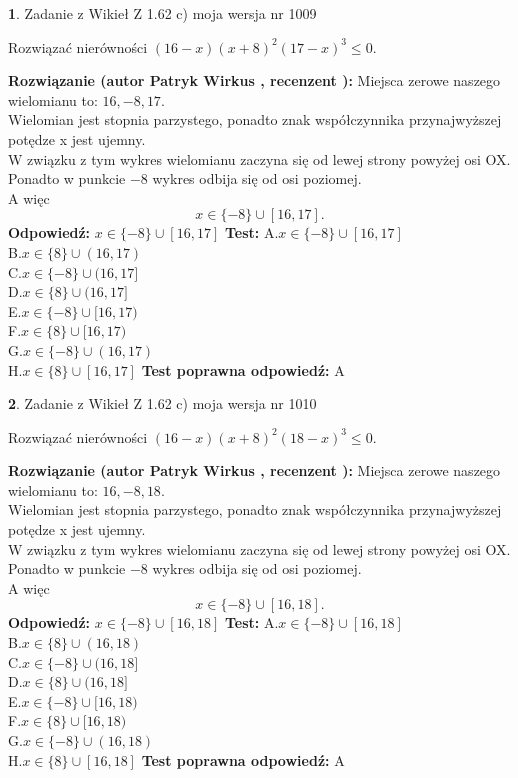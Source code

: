 \documentclass[12pt, a4paper]{article}
\theoremstyle{definition} %
\newtheorem{zad}{}
\newcommand{\zadStart}[1]{\begin{zad}#1\newline}
\newcommand{\zadStop}{\end{zad}}
\newcommand{\rozwStart}[2]{\noindent \textbf{Rozwiązanie (autor #1 , recenzent #2): }\newline}
\newcommand{\rozwStop}{\newline}
\newcommand{\odpStart}{\noindent \textbf{Odpowiedź:}\newline}
\newcommand{\odpStop}{\newline}
\newcommand{\testStart}{\noindent \textbf{Test:}\newline}
\newcommand{\testStop}{\newline}
\newcommand{\kluczStart}{\noindent \textbf{Test poprawna odpowiedź:}\newline}
\newcommand{\kluczStop}{\newline}
\begin{document}
\zadStart{Zadanie z Wikieł Z 1.62 c) moja wersja nr 1009}

Rozwiązać nierówności $(16-x)(x+8)^{2}(17-x)^{3}\le0$.
\zadStop
\rozwStart{Patryk Wirkus}{}
Miejsca zerowe naszego wielomianu to: $16, -8, 17$.\\
Wielomian jest stopnia parzystego, ponadto znak współczynnika przy\linebreak najwyższej potędze x jest ujemny.\\ W związku z tym wykres wielomianu zaczyna się od lewej strony powyżej osi OX.\\
Ponadto w punkcie $-8$ wykres odbija się od osi poziomej.\\
A więc $$x \in \{-8\} \cup [16,17].$$
\rozwStop
\odpStart
$x \in \{-8\} \cup [16,17]$
\odpStop
\testStart
A.$x \in \{-8\} \cup [16,17]$\\
B.$x \in \{8\} \cup (16,17)$\\
C.$x \in \{-8\} \cup (16,17]$\\
D.$x \in \{8\} \cup (16,17]$\\
E.$x \in \{-8\} \cup [16,17)$\\
F.$x \in \{8\} \cup [16,17)$\\
G.$x \in \{-8\} \cup (16,17)$\\
H.$x \in \{8\} \cup [16,17]$
\testStop
\kluczStart
A
\kluczStop



\zadStart{Zadanie z Wikieł Z 1.62 c) moja wersja nr 1010}

Rozwiązać nierówności $(16-x)(x+8)^{2}(18-x)^{3}\le0$.
\zadStop
\rozwStart{Patryk Wirkus}{}
Miejsca zerowe naszego wielomianu to: $16, -8, 18$.\\
Wielomian jest stopnia parzystego, ponadto znak współczynnika przy\linebreak najwyższej potędze x jest ujemny.\\ W związku z tym wykres wielomianu zaczyna się od lewej strony powyżej osi OX.\\
Ponadto w punkcie $-8$ wykres odbija się od osi poziomej.\\
A więc $$x \in \{-8\} \cup [16,18].$$
\rozwStop
\odpStart
$x \in \{-8\} \cup [16,18]$
\odpStop
\testStart
A.$x \in \{-8\} \cup [16,18]$\\
B.$x \in \{8\} \cup (16,18)$\\
C.$x \in \{-8\} \cup (16,18]$\\
D.$x \in \{8\} \cup (16,18]$\\
E.$x \in \{-8\} \cup [16,18)$\\
F.$x \in \{8\} \cup [16,18)$\\
G.$x \in \{-8\} \cup (16,18)$\\
H.$x \in \{8\} \cup [16,18]$
\testStop
\kluczStart
A
\kluczStop
\end{document}
